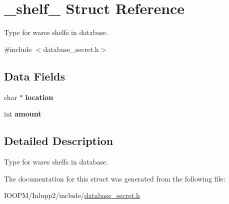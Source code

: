 \hypertarget{struct__shelf__}{}\section{\+\_\+shelf\+\_\+ Struct Reference}
\label{struct__shelf__}


Type for wares shelfs in database.  




{\ttfamily \#include $<$database\+\_\+secret.\+h$>$}

\subsection*{Data Fields}
\begin{DoxyCompactItemize}
\item 
\hypertarget{struct__shelf___a6a0d5603410d5eda93c0ff341966cce1}{}char $\ast$ {\bfseries location}\label{struct__shelf___a6a0d5603410d5eda93c0ff341966cce1}

\item 
\hypertarget{struct__shelf___a14236de313193a14b4dbdf442bcf2bb9}{}int {\bfseries amount}\label{struct__shelf___a14236de313193a14b4dbdf442bcf2bb9}

\end{DoxyCompactItemize}


\subsection{Detailed Description}
Type for wares shelfs in database. 

The documentation for this struct was generated from the following file\+:\begin{DoxyCompactItemize}
\item 
I\+O\+O\+P\+M/\+Inlupp2/include/\hyperlink{database__secret_8h}{database\+\_\+secret.\+h}\end{DoxyCompactItemize}

